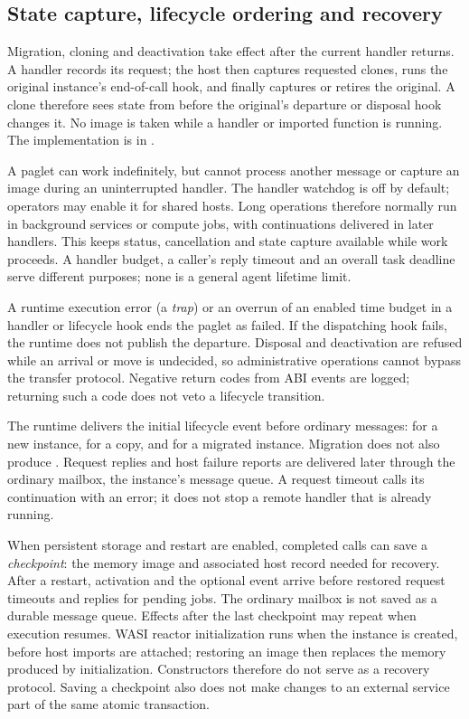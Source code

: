 
\subsection{State capture, lifecycle ordering and recovery}\label{sec:lifecycle}

Migration, cloning and deactivation take effect after the current handler
returns. A handler records its request; the host then captures requested
clones, runs the original instance's end-of-call hook, and finally
captures or retires the original. A clone therefore sees state from
before the original's departure or disposal hook changes it. No image is
taken while a handler or imported function is running. The implementation
is in .

A paglet can work indefinitely, but cannot process another message or
capture an image during an uninterrupted handler. The handler watchdog is
off by default; operators may enable it for shared hosts. Long operations
therefore normally run in background services or compute jobs, with
continuations delivered in later handlers. This keeps status, cancellation
and state capture available while work proceeds. A handler budget, a
caller's reply timeout and an overall task deadline serve different
purposes; none is a general agent lifetime limit.

A runtime execution error (a \emph{trap}) or an overrun of an enabled time
budget in a handler or lifecycle hook ends the paglet as failed. If the dispatching
hook fails, the runtime does not publish the departure. Disposal and
deactivation are refused while an arrival or move is undecided, so
administrative operations cannot bypass the transfer protocol. Negative
return codes from ABI events are logged; returning such a code does not
veto a lifecycle transition.

The runtime delivers the initial lifecycle event before ordinary
messages:  for a new instance,  for a copy, and
 for a migrated instance. Migration does not also produce
. Request replies and host failure reports are delivered
later through the ordinary mailbox, the instance's message queue.
A request timeout calls its continuation with an error; it does not stop
a remote handler that is already running.

When persistent storage and restart are enabled, completed calls can
save a \emph{checkpoint}: the memory image and associated host record
needed for recovery. After a restart, activation and the optional
 event arrive before restored request timeouts and
 replies for pending jobs. The ordinary mailbox is not saved
as a durable message queue. Effects after the last checkpoint may repeat
when execution resumes. WASI reactor initialization runs when the instance
is created, before host imports are attached; restoring an image then
replaces the memory produced by initialization. Constructors therefore do
not serve as a recovery protocol. Saving a checkpoint also does not make
changes to an external service part of the same atomic transaction.
